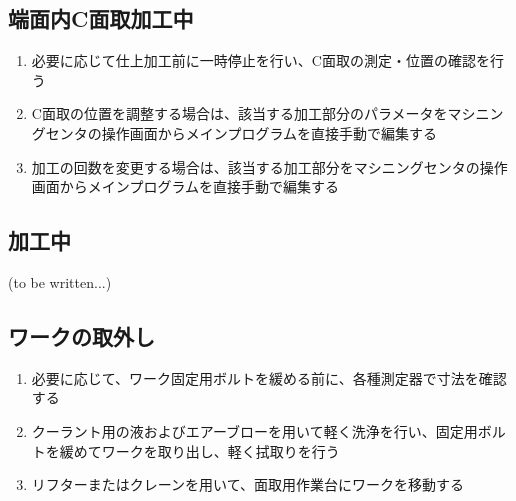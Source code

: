 \clearpage
\subsection{端面内C面取加工中}
\begin{enumerate}
\item 必要に応じて仕上加工前に一時停止を行い、C面取の測定・位置の確認を行う
\item C面取の位置を調整する場合は、該当する加工部分のパラメータをマシニングセンタの操作画面からメインプログラムを直接手動で編集する
\item {}加工の回数を変更する場合は、該当する加工部分をマシニングセンタの操作画面からメインプログラムを直接手動で編集する
\end{enumerate}


\subsection{\EndFaceBoring 加工中\TBW}
(to be written...)



\clearpage


\subsection{ワークの取外し}
\begin{enumerate}
\item 必要に応じて、ワーク固定用ボルトを緩める前に、各種測定器で寸法を確認する
\item クーラント用の液およびエアーブローを用いて軽く洗浄を行い、固定用ボルトを緩めてワークを取り出し、軽く拭取りを行う
\item {}リフターまたはクレーンを用いて、面取用作業台にワークを移動する
\end{enumerate}


